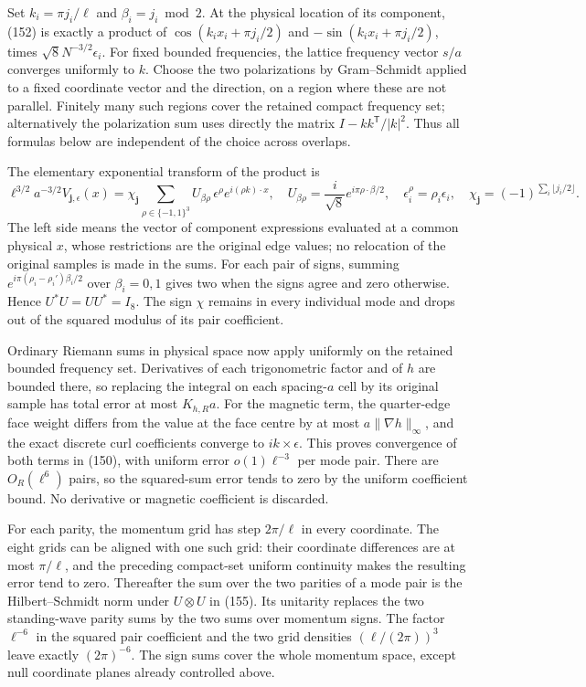 \documentclass[11pt]{article}
\begin{document}
Set $k_i=\pi j_i/\ell$ and $\beta_i=j_i\bmod2$. At the physical
location of its component, (152) is exactly a
product of
$\cos(k_ix_i+\pi j_i/2)$ and $-\sin(k_ix_i+\pi j_i/2)$,
times $\sqrt8N^{-3/2}\epsilon_i$. For fixed bounded frequencies,
the lattice frequency vector $s/a$ converges uniformly to $k$.
Choose the two polarizations by Gram--Schmidt applied to a fixed
coordinate vector and the direction, on a region where these are not
parallel. Finitely many such regions cover the retained compact
frequency set; alternatively the polarization sum uses directly the
matrix $I-kk^{\mathsf T}/|k|^2$. Thus all formulas below are
independent of the choice across overlaps.

The elementary exponential transform of the product is
\begin{equation}\label{eq:full-parity-unitary}
 \ell^{3/2}a^{-3/2}V_{\boldsymbol j,\epsilon}(x)
   =\chi_{\boldsymbol j}\sum_{\rho\in\{-1,1\}^3}
       U_{\beta\rho}\,\epsilon^\rho e^{i(\rho k)\cdot x},
 \quad U_{\beta\rho}=\frac{i}{\sqrt8}e^{i\pi\rho\cdot\beta/2},
 \quad \epsilon^\rho_i=\rho_i\epsilon_i,
 \quad \chi_{\boldsymbol j}=(-1)^{\sum_i\lfloor j_i/2\rfloor}.
\end{equation}
The left side means the vector of component expressions evaluated
at a common physical $x$, whose restrictions are the original edge
values; no relocation of the original samples is made in the sums.
For each pair of signs, summing
$e^{i\pi(\rho_i-\rho_i')\beta_i/2}$ over $\beta_i=0,1$ gives two
when the signs agree and zero otherwise. Hence $U^*U=UU^*=I_8$.
The sign $\chi$ remains in every individual mode and drops out of
the squared modulus of its pair coefficient.

Ordinary Riemann sums in physical space now apply uniformly on the
retained bounded frequency set. Derivatives of each trigonometric
factor and of $h$ are bounded there, so replacing the integral on
each spacing-$a$ cell by its original sample has total error at most
$K_{h,R}a$. For the magnetic term, the quarter-edge face weight
differs from the value at the face centre by at most
$a\|\nabla h\|_\infty$, and the exact discrete curl coefficients
converge to $ik\times\epsilon$. This proves convergence of both
terms in (150), with uniform error
$o(1)\ell^{-3}$ per mode pair. There are $O_R(\ell^6)$ pairs,
so the squared-sum error tends to zero by the uniform coefficient
bound. No derivative or magnetic coefficient is discarded.

For each parity, the momentum grid has step $2\pi/\ell$ in every
coordinate. The eight grids can be aligned with one such grid:
their coordinate differences are at most $\pi/\ell$, and the
preceding compact-set uniform continuity makes the resulting error
tend to zero. Thereafter the sum over the two parities of a mode
pair is the Hilbert--Schmidt norm under $U\otimes U$ in
(155). Its unitarity replaces the two
standing-wave parity sums by the two sums over momentum signs.
The factor $\ell^{-6}$ in the squared pair coefficient and the
two grid densities $(\ell/(2\pi))^3$ leave exactly $(2\pi)^{-6}$.
The sign sums cover the whole momentum space, except null coordinate
planes already controlled above.
\end{document}
